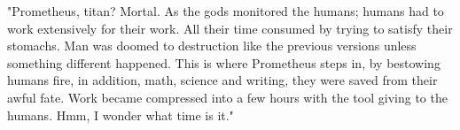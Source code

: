 \begin{Document}
        "Prometheus, titan? Mortal. As the gods monitored the humans; humans had to work extensively for their work. All their time consumed by trying to satisfy
    their stomachs. Man was doomed to destruction like the previous versions unless something different happened. This is where Prometheus steps in, by bestowing
    humans fire, in addition, math, science and writing, they were saved from their awful fate. Work became compressed into a few hours with the tool giving
    to the humans. Hmm, I wonder what time is it." 
\end{Document}
